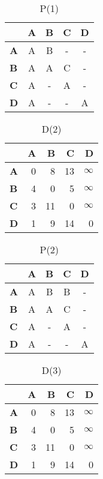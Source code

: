 \documentclass[11pt]{article}
\newcommand{\INF}{$\infty$}
\begin{document}
\begin{table}[H]\centering
\caption{P(1)}
\begin{tabular}{l c c c c}
\toprule
 & \textbf{A} & \textbf{B} & \textbf{C} & \textbf{D}\\\midrule
\textbf{A} & \cellcolor{yellow!30}A & B & - & - \\
\textbf{B} & A & \cellcolor{yellow!30}A & C & - \\
\textbf{C} & A & - & \cellcolor{yellow!30}A & - \\
\textbf{D} & A & - & - & \cellcolor{yellow!30}A \\
\bottomrule
\end{tabular}
\end{table}

\begin{table}[H]\centering
\caption{D(2)}
\begin{tabular}{l r r r r}
\toprule
 & \textbf{A} & \textbf{B} & \textbf{C} & \textbf{D}\\\midrule
\textbf{A} & 0 & 8 & \cellcolor{yellow!30}13 & \INF \\
\textbf{B} & 4 & 0 & 5 & \INF \\
\textbf{C} & 3 & 11 & 0 & \INF \\
\textbf{D} & 1 & 9 & \cellcolor{yellow!30}14 & 0 \\
\bottomrule
\end{tabular}
\end{table}

\begin{table}[H]\centering
\caption{P(2)}
\begin{tabular}{l c c c c}
\toprule
 & \textbf{A} & \textbf{B} & \textbf{C} & \textbf{D}\\\midrule
\textbf{A} & A & B & \cellcolor{yellow!30}B & - \\
\textbf{B} & A & A & C & - \\
\textbf{C} & A & - & A & - \\
\textbf{D} & A & - & - & A \\
\bottomrule
\end{tabular}
\end{table}

\begin{table}[H]\centering
\caption{D(3)}
\begin{tabular}{l r r r r}
\toprule
 & \textbf{A} & \textbf{B} & \textbf{C} & \textbf{D}\\\midrule
\textbf{A} & 0 & 8 & 13 & \INF \\
\textbf{B} & 4 & 0 & 5 & \INF \\
\textbf{C} & 3 & 11 & 0 & \INF \\
\textbf{D} & 1 & 9 & 14 & 0 \\
\bottomrule
\end{tabular}
\end{table}
\end{document}
